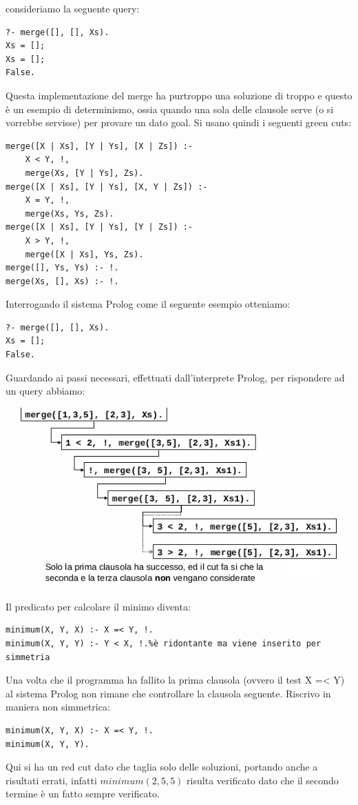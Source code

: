 \documentclass[a4paper]{book}
\begin{document}
consideriamo la seguente query:
\begin{verbatim}
?- merge([], [], Xs).
Xs = [];
Xs = [];
False.
\end{verbatim}
Questa implementazione del merge ha purtroppo una soluzione di troppo e questo è un esempio di determinismo, ossia
quando una sola delle clausole serve (o si vorrebbe servisse) per provare un dato goal.\newline
Si usano quindi i seguenti green cuts:
\begin{verbatim}
merge([X | Xs], [Y | Ys], [X | Zs]) :-
	X < Y, !,
	merge(Xs, [Y | Ys], Zs).
merge([X | Xs], [Y | Ys], [X, Y | Zs]) :-
	X = Y, !,
	merge(Xs, Ys, Zs).
merge([X | Xs], [Y | Ys], [Y | Zs]) :-
	X > Y, !,
	merge([X | Xs], Ys, Zs).
merge([], Ys, Ys) :- !.
merge(Xs, [], Xs) :- !.
\end{verbatim}
Interrogando il sistema Prolog come il seguente esempio otteniamo:
\begin{verbatim}
?- merge([], [], Xs).
Xs = [];
False.
\end{verbatim}
Guardando ai passi necessari, effettuati dall'interprete Prolog, per rispondere ad un query abbiamo:
\begin{center}
\includegraphics[scale=0.8]{img/cut3.png}
\end{center}
Il predicato per calcolare il minimo diventa:
\begin{verbatim}
minimum(X, Y, X) :- X =< Y, !.
minimum(X, Y, Y) :- Y < X, !.%è ridontante ma viene inserito per simmetria
\end{verbatim}
Una volta che il programma ha fallito la prima clausola (ovvero il test X =< Y) al sistema Prolog non rimane che controllare la
clausola seguente.\newline
Riscrivo in maniera non simmetrica:
\begin{verbatim}
minimum(X, Y, X) :- X =< Y, !.
minimum(X, Y, Y).
\end{verbatim}
Qui si ha un red cut dato che taglia solo delle soluzioni, portando anche a risultati errati, infatti $minimum(2, 5, 5)$ risulta verificato
dato che il secondo termine è un fatto sempre verificato.
\end{document}
